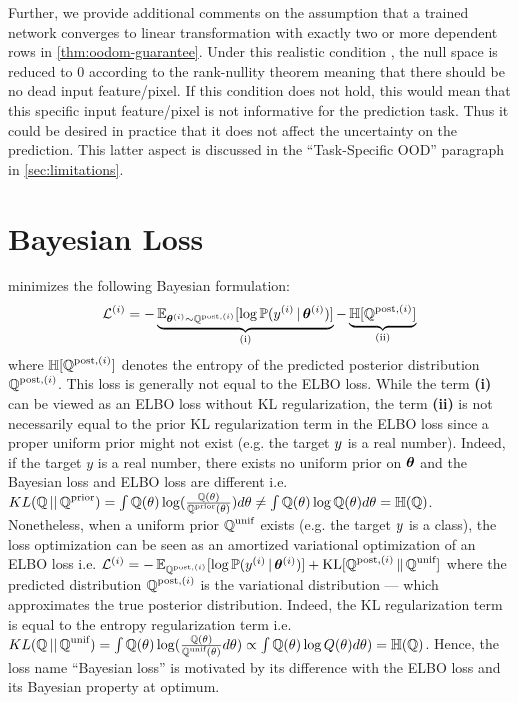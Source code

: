 Further, we provide additional comments on the assumption that a trained network converges to linear transformation with exactly two or more dependent rows in \cref{thm:oodom-guarantee}. Under this realistic condition \cite{overconfident-relu}, the null space is reduced to $0$ according to the rank-nullity theorem meaning that there should be no dead input feature/pixel. If this condition does not hold, this would mean that this specific input feature/pixel is not informative for the prediction task. Thus it could be desired in practice that it does not affect the uncertainty on the prediction. This latter aspect is discussed in the “Task-Specific OOD” paragraph in \cref{sec:limitations}.

\section{Bayesian Loss} 
\label{sec:loss}

\NatPNacro{} minimizes the following Bayesian formulation:
%
\begin{equation}
    \mathcal{L}^{(i)} = - \underbrace{\operatorname{\mathbb{E}}_{\bm{\theta}^{(i)} \sim \operatorname{\mathbb{Q}}^{\text{post},(i)}}[\log \mathbb{P}(y^{(i)}\,|\, \bm{\theta} ^{(i)})]}_\text{(i)} - \underbrace{\operatorname{\mathbb{H}}[\operatorname{\mathbb{Q}}^{\text{post},(i)}]}_\text{(ii)}
\end{equation}
%
where $\operatorname{\mathbb{H}}[\operatorname{\mathbb{Q}}^{\text{post},(i)}]$ denotes the entropy of the predicted posterior distribution $\operatorname{\mathbb{Q}}^{\text{post},(i)}$. This loss is generally not equal to the ELBO loss. While the term \textbf{(i)} can be viewed as an ELBO loss without KL regularization, the term \textbf{(ii)} is not necessarily equal to the prior KL regularization term in the ELBO loss since a proper uniform prior might not exist (e.g. the target $y$ is a real number). Indeed, if the target $y$ is a real number, there exists no uniform prior on $\bm{\theta}$ and the Bayesian loss and ELBO loss are different i.e. $KL(\operatorname{\mathbb{Q}}||\operatorname{\mathbb{Q}}^\text{prior}) = \int \operatorname{\mathbb{Q}}(\theta) \log (\frac{\operatorname{\mathbb{Q}}(\theta)}{\operatorname{\mathbb{Q}}^\text{prior}(\theta)}) d\theta \neq \int \operatorname{\mathbb{Q}}(\theta) \log \operatorname{\mathbb{Q}}(\theta) d\theta = \operatorname{\mathbb{H}}(\operatorname{\mathbb{Q}})$. Nonetheless, when a uniform prior $\operatorname{\mathbb{Q}}^\text{unif}$ exists (e.g. the target $y$ is a class), the loss optimization can be seen as an amortized variational optimization of an ELBO loss \citep{amortized-variational-inference} i.e. $\mathcal{L}^{(i)} = - \operatorname{\mathbb{E}}_{\operatorname{\mathbb{Q}}^{\text{post},(i)}}[\log \mathbb{P}(y^{(i)}\,|\, \bm{\theta} ^{(i)})] + \text{KL}[\operatorname{\mathbb{Q}}^{\text{post},(i)}\|\operatorname{\mathbb{Q}}^\text{unif}]$ where the predicted distribution $\operatorname{\mathbb{Q}}^{\text{post},(i)}$ is the variational distribution --- which approximates the true posterior distribution. Indeed, the KL regularization term is equal to the entropy regularization term i.e. $KL(\operatorname{\mathbb{Q}}||\operatorname{\mathbb{Q}}^\text{unif}) = \int \operatorname{\mathbb{Q}}(\theta) \log (\frac{\operatorname{\mathbb{Q}}(\theta)}{\operatorname{\mathbb{Q}}^\text{unif}(\theta)} d\theta) \propto \int \operatorname{\mathbb{Q}}(\theta) \log Q(\theta) d\theta) = \operatorname{\mathbb{H}}(\operatorname{\mathbb{Q}})$. Hence, the loss name ``Bayesian loss'' \citep{charpentier2020} is motivated by its difference with the ELBO loss and its Bayesian property at optimum.

